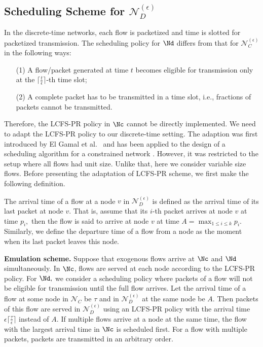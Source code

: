 \subsection{Scheduling Scheme for $\mathcal{N}_{D}^{(\epsilon)}$\label{subsec:Nd}}

In the discrete-time networks, each flow is packetized and time is
slotted for packetized transmission. The scheduling policy for $\Nd$
differs from that for $\mathcal{N}_{C}^{(\epsilon)}$ in the following
ways: 
\begin{enumerate}
\item[(1)] A flow/packet generated at time $t$ becomes eligible for transmission
only at the $\lceil\frac{t}{\epsilon}\rceil$-th time slot; 
\item[(2)] A complete packet has to be transmitted in a time slot, i.e., fractions
of packets cannot be transmitted. 
\end{enumerate}
Therefore, the LCFS-PR policy in $\Nc$ cannot be directly implemented.
We need to adapt the LCFS-PR policy to our discrete-time setting.
The adaption was first introduced by El Gamal et al.~\cite{gamal2006throughput_delay}
and has been applied to the design of a scheduling algorithm for a
constrained network \cite{jagabathula2008delay_scheduling}. However,
it was restricted to the setup where all flows had unit size. Unlike that, here we
consider variable size flows. Before presenting the adaptation of LCFS-PR scheme, 
we first make the following definition. 
\begin{defn}
The arrival time of a flow at a node $v$ 
in $\mathcal{N}_{D}^{(\epsilon)}$
is defined as the arrival time of its last packet at node
$v$. That is, assume that its $i$-th packet arrives at node $v$
at time $p_{i},$ then the flow is said to arrive at node $v$ at
time $A=\max_{1\leq i\leq k}p_{i}.$ Similarly, we define the departure
time of a flow from a node as the moment when its last packet leaves
this node. 
\end{defn}

\medskip
\noindent\textbf{Emulation scheme. }Suppose that exogenous flows arrive at
$\Nc$ and $\Nd$ simultaneously. In $\Nc$, flows are served at each
node according to the LCFS-PR policy. For $\Nd,$ we consider a scheduling
policy where packets of a flow will not be eligible for transmission
until the full flow arrives. Let the arrival time of a flow at some
node in $\mathcal{N}_{C}$ be $\tau$ and in $\mathcal{N}_{D}^{(\epsilon)}$
at the same node be $A.$ Then packets of this flow are served in
$\mathcal{N}_{D}^{(\epsilon)}$ using an LCFS-PR policy with the arrival
time $\epsilon\lceil\frac{\tau}{\epsilon}\rceil$ instead of $A.$
If multiple flows arrive at a node at the same time, the flow with
the largest arrival time in $\Nc$ is scheduled first. For a flow
with multiple packets, packets are transmitted in an arbitrary
order.

